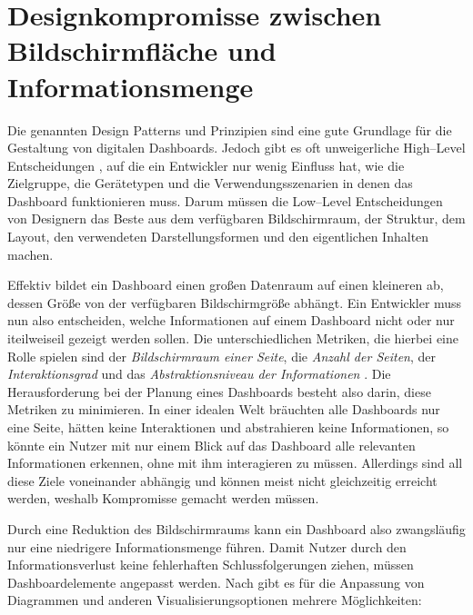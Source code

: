 \section{Designkompromisse zwischen Bildschirmfläche und Informationsmenge}

Die genannten Design Patterns und Prinzipien sind eine gute Grundlage für die Gestaltung von digitalen Dashboards.
Jedoch gibt es oft unweigerliche High--Level Entscheidungen \autocite[S. 6]{Bach.DashboardDesignPatterns.2023}, auf die ein Entwickler nur wenig Einfluss hat, wie die Zielgruppe, die Gerätetypen und die Verwendungsszenarien in denen das Dashboard funktionieren muss.
Darum müssen die Low--Level Entscheidungen von Designern das Beste aus dem verfügbaren Bildschirmraum, der Struktur, dem Layout, den verwendeten Darstellungsformen und den eigentlichen Inhalten machen.

Effektiv bildet ein Dashboard einen großen Datenraum auf einen kleineren ab, dessen Größe von der verfügbaren Bildschirmgröße abhängt.
Ein Entwickler muss nun also entscheiden, welche Informationen auf einem Dashboard nicht oder nur iteilweiseil gezeigt werden sollen.
Die unterschiedlichen Metriken, die hierbei eine Rolle spielen sind der \emph{Bildschirmraum einer Seite}, die \emph{Anzahl der Seiten}, der \emph{Interaktionsgrad} und das \emph{Abstraktionsniveau der Informationen} \autocite[S. 6]{Bach.DashboardDesignPatterns.2023}.
Die Herausforderung bei der Planung eines Dashboards besteht also darin, diese Metriken zu minimieren.
In einer idealen Welt bräuchten alle Dashboards nur eine Seite, hätten keine Interaktionen und abstrahieren keine Informationen, so könnte ein Nutzer mit nur einem Blick auf das Dashboard alle relevanten Informationen erkennen, ohne mit ihm interagieren zu müssen.
Allerdings sind all diese Ziele voneinander abhängig und können meist nicht gleichzeitig erreicht werden, weshalb Kompromisse gemacht werden müssen.

Durch eine Reduktion des Bildschirmraums kann ein Dashboard also zwangsläufig nur eine niedrigere Informationsmenge führen.
Damit Nutzer durch den Informationsverlust keine fehlerhaften Schlussfolgerungen ziehen, müssen Dashboardelemente angepasst werden.
Nach \autocite[S. 463--464]{Kim.DesignPatternTradeOffs.2021} gibt es für die Anpassung von Diagrammen und anderen Visualisierungsoptionen mehrere Möglichkeiten:

